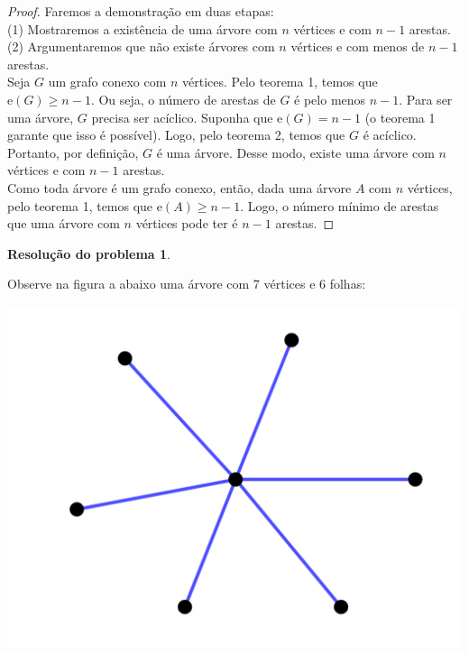 \documentclass[12pt, a4paper]{article}
\theoremstyle{definition} \newtheorem{prob}{Problema}
\newtheorem{res}{Resolução do problema}
\theoremstyle{plain} \newtheorem*{teo}{Teorema}
\begin{document}
\begin{proof}
Faremos a demonstração em duas etapas: \\

(1) Mostraremos a existência de uma árvore com \(n\) vértices e com \(n-1\) arestas.\\

(2) Argumentaremos que não existe árvores com \(n\) vértices e com menos de \(n-1\) arestas.\\

Seja \(G\) um grafo conexo com \(n\) vértices. Pelo teorema 1, temos que \(\mathrm{e}(G) \geq n-1\). Ou seja, o número de arestas de \(G\) é pelo menos \(n-1\). Para ser uma árvore, \(G\) precisa ser acíclico. Suponha que \(\mathrm{e}(G) = n-1\) (o teorema 1 garante que isso é possível). Logo, pelo teorema 2, temos que \(G\) é acíclico. Portanto, por definição, \(G\) é uma árvore. Desse modo, existe uma árvore com \(n\) vértices e com \(n-1\) arestas. \\

Como toda árvore é um grafo conexo, então, dada uma árvore \(A\) com \(n\) vértices, pelo teorema 1, temos que \(\mathrm{e}(A) \geq n-1\). Logo, o número mínimo de arestas que uma árvore com \(n\) vértices pode ter é \(n-1\) arestas.
  
\end{proof}



\begin{res} %
\end{res}
Observe na figura a abaixo uma árvore com 7 vértices e 6 folhas: \\

\begin{center}
\includegraphics[scale=0.25]{arvore_6folhas.png}
\end{center}
\end{document}
